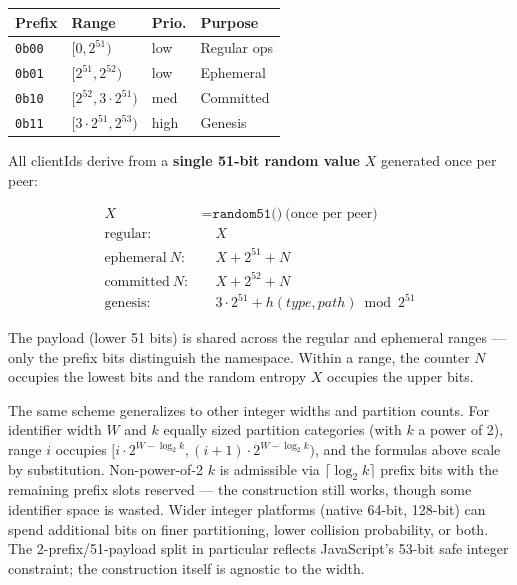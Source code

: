 \begin{center}
\footnotesize
\begin{tabular}{@{}llll@{}}
\toprule
\textbf{Prefix} & \textbf{Range} & \textbf{Prio.} & \textbf{Purpose} \\
\midrule
\texttt{0b00} & $[0, 2^{51})$ & low & Regular ops \\
\texttt{0b01} & $[2^{51}, 2^{52})$ & low & Ephemeral \\
\texttt{0b10} & $[2^{52}, 3{\cdot}2^{51})$ & med & Committed \\
\texttt{0b11} & $[3{\cdot}2^{51}, 2^{53})$ & high & Genesis \\
\bottomrule
\end{tabular}
\end{center}

All clientIds derive from a \textbf{single 51-bit random value} $X$ generated once per peer:

{\footnotesize
\begin{align*}
X &= \texttt{random51()}\ \text{(once per peer)} \\
\text{regular:} &\quad X \\
\text{ephemeral}\ N: &\quad X + 2^{51} + N \\
\text{committed}\ N: &\quad X + 2^{52} + N \\
\text{genesis:} &\quad 3{\cdot}2^{51} + h(\mathit{type,path}) \bmod 2^{51}
\end{align*}
}

The payload (lower 51 bits) is shared across the regular and ephemeral ranges --- only the prefix bits distinguish the namespace. Within a range, the counter $N$ occupies the lowest bits and the random entropy $X$ occupies the upper bits.

The same scheme generalizes to other integer widths and partition counts. For identifier width $W$ and $k$ equally sized partition categories (with $k$ a power of 2), range $i$ occupies $[i \cdot 2^{W - \log_2 k}, (i+1) \cdot 2^{W - \log_2 k})$, and the formulas above scale by substitution. Non-power-of-2 $k$ is admissible via $\lceil \log_2 k \rceil$ prefix bits with the remaining prefix slots reserved --- the construction still works, though some identifier space is wasted. Wider integer platforms (native 64-bit, 128-bit) can spend additional bits on finer partitioning, lower collision probability, or both. The 2-prefix/51-payload split in particular reflects JavaScript's 53-bit safe integer constraint; the construction itself is agnostic to the width.

